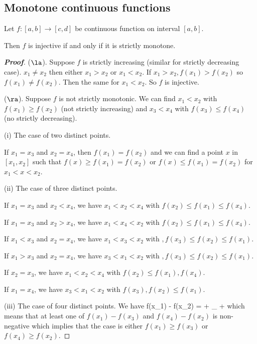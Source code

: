 \subsection{Monotone continuous functions}

\begin{lemma}
Let $f:[a,b]\to [c,d]$ be continuous function on interval $[a,b]$.

Then $f$ is injective if and only if it is strictly monotone.
\end{lemma}

\begin{proof}[\bf Proof]
($\la$). Suppose $f$ is strictly increasing (similar for strictly decreasing case). $x_1 \neq x_2$ then either $x_1 > x_2$ or $x_1 < x_2$. If $x_1 > x_2, f(x_1) > f(x_2)$ so $f(x_1) \neq f(x_2)$. Then the same for $x_1 < x_2$. So $f$ is injective.

($\ra$). Suppose $f$ is not strictly monotonic. We can find $x_1<x_2$ with $f(x_1) \geq f(x_2)$ (not strictly increasing) and $x_3<x_4$ with $f(x_3)\leq f(x_4)$ (no strictly decreasing).
\ben
\item [(i)] The case of two distinct points.

If $x_1=x_3$ and $x_2 = x_4$, then $f(x_1) = f(x_2)$ and we can find a point $x$ in $[x_1,x_2]$ such that $f(x)\geq f(x_1) =f(x_2)$ or $f(x)\leq f(x_1) =f(x_2)$ for $x_1<x<x_2$.


\item [(ii)] The case of three distinct points.

If $x_1=x_3$ and $x_2 < x_4$, we have $x_1 <x_2 < x_4$ with $f(x_2) \leq f(x_1) \leq f(x_4)$.

If $x_1=x_3$ and $x_2 > x_4$, we have $x_1 <x_4 < x_2$ with $f(x_2) \leq f(x_1) \leq f(x_4)$.

If $x_1<x_3$ and $x_2 = x_4$, we have $x_1 <x_3 < x_2$ with $,f(x_3) \leq f(x_2) \leq f(x_1)$.

If $x_1>x_3$ and $x_2 = x_4$, we have $x_3 <x_1 < x_2$ with $,f(x_3) \leq f(x_2) \leq f(x_1)$.

If $x_2 = x_3$, we have $x_1<x_2<x_4$ with $f(x_2) \leq f(x_1),f(x_4)$.

If $x_1 = x_4$, we have $x_3<x_1<x_2$ with $f(x_3),f(x_2) \leq f(x_1)$.

\item [(iii)] The case of four distinct points. We have
\leq f(x_1) - f(x_2) =  + _{} + 
\ee
which means that at least one of $f(x_1)- f(x_3)$ and $f(x_4)-f(x_2)$ is non-negative which implies that the case is either $f(x_1)\geq f(x_3)$ or $f(x_4)\geq f(x_2)$.


\end{proof}
